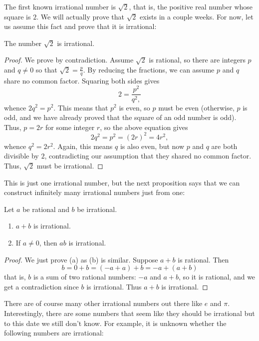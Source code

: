 \documentclass[11pt,dvipsnames]{book}
\numberwithin{figure}{section} %
\numberwithin{table}{section} %
\begin{document}
The first known irrational number is $\sqrt{2}$, that is, the positive real number whose square is $2$. We will actually prove that $\sqrt{2}$ exists in a couple weeks. For now, let us assume this fact and prove that it is irrational:
\begin{theorem}
The number $\sqrt{2}$ is irrational.
\end{theorem}

\begin{proof}
We prove by contradiction. Assume $\sqrt{2}$ is rational, so there are integers $p$ and $q\neq 0$ so that $\sqrt{2}=\frac{p}{q}$. By reducing the fractions, we can assume $p$ and $q$ share no common factor. Squaring both sides gives
\[
2=\frac{p^{2}}{q^2,}
\]
whence $2q^2=p^2$.
This means that $p^2$ is even, so $p$ must be even (otherwise, $p$ is odd, and we have already proved that the square of an odd number is odd). Thus, $p=2r$ for some integer $r$, so the above equation gives
\[
2q^2=p^2=(2r)^2=4r^2,
\]
whence $ q^2=2r^2$.
Again, this means $q$ is also even, but now $p$ and $q$ are both divisible by $2$, contradicting our assumption that they shared no common factor. Thus, $\sqrt{2}$ must be irrational.
\end{proof}

This is just one irrational number, but the next proposition says that we can construct infinitely many irrational numbers just from one:

\begin{proposition}
Let $a$ be rational and $b$ be irrational. 
\begin{enumerate}[label=(\alph*)]
\item $a+b$ is irrational.
\item If $a\neq 0$, then $ab$ is irrational.
\end{enumerate}
\end{proposition}

\begin{proof}
We just prove (a) as (b) is similar. Suppose $a+b$ is rational. Then
\[
b=0+b=(-a+a)+b=-a+(a+b)
\]
that is, $b$ is a sum of two rational numbers: $-a$ and $a+b$, so it is rational, and we get a contradiction since $b$ is irrational. Thus $a+b$ is irrational.
\end{proof}


There are of course many other irrational numbers out there like $e$ and $\pi$. Interestingly, there are some numbers that seem like they should be irrational but to this date we still don't know. For example, it is unknown whether the following numbers are irrational:
\end{document}
